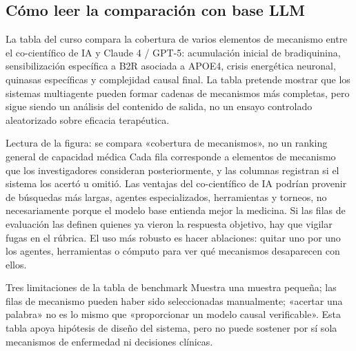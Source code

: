
\subsection{Cómo leer la comparación con base LLM}

La tabla del curso compara la cobertura de varios elementos de mecanismo entre el co-científico de IA y Claude 4 / GPT-5: acumulación inicial de bradiquinina, sensibilización específica a B2R asociada a APOE4, crisis energética neuronal, quinasas específicas y complejidad causal final. La tabla pretende mostrar que los sistemas multiagente pueden formar cadenas de mecanismos más completas, pero sigue siendo un análisis del contenido de salida, no un ensayo controlado aleatorizado sobre eficacia terapéutica.


\begin{knowledgebox}{Lectura de la figura: se compara «cobertura de mecanismos», no un ranking general de capacidad médica}
Cada fila corresponde a elementos de mecanismo que los investigadores consideran posteriormente, y las columnas registran si el sistema los acertó u omitió. Las ventajas del co-científico de IA podrían provenir de búsquedas más largas, agentes especializados, herramientas y torneos, no necesariamente porque el modelo base entienda mejor la medicina. Si las filas de evaluación las definen quienes ya vieron la respuesta objetivo, hay que vigilar fugas en el rúbrica. El uso más robusto es hacer ablaciones: quitar uno por uno los agentes, herramientas o cómputo para ver qué mecanismos desaparecen con ellos.
\end{knowledgebox}

\begin{warningbox}{Tres limitaciones de la tabla de benchmark}
Muestra una muestra pequeña; las filas de mecanismo pueden haber sido seleccionadas manualmente; «acertar una palabra» no es lo mismo que «proporcionar un modelo causal verificable». Esta tabla apoya hipótesis de diseño del sistema, pero no puede sostener por sí sola mecanismos de enfermedad ni decisiones clínicas.
\end{warningbox}

